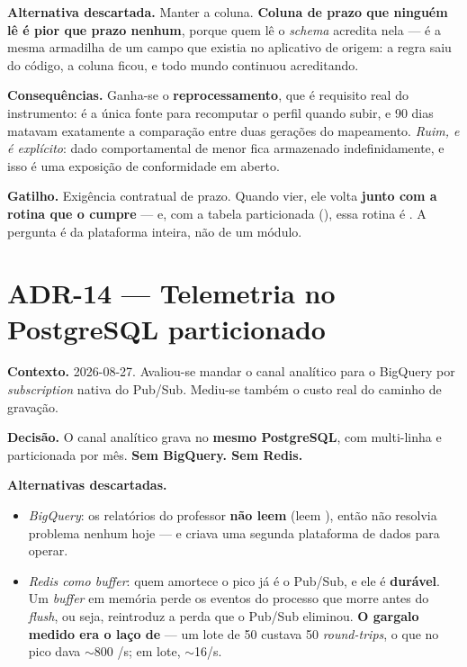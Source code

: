 \textbf{Alternativa descartada.} Manter a coluna. \textbf{Coluna de prazo que
ninguém lê é pior que prazo nenhum}, porque quem lê o \emph{schema} acredita nela
--- é a mesma armadilha de um campo  que existia no
aplicativo de origem: a regra saiu do código, a coluna ficou, e todo mundo
continuou acreditando.

\textbf{Consequências.} Ganha-se o \textbf{reprocessamento}, que é requisito real
do instrumento:  é a única fonte para recomputar o perfil quando
 subir, e 90 dias matavam exatamente a comparação entre
duas gerações do mapeamento. \emph{Ruim, e é explícito}: dado comportamental de
menor fica armazenado indefinidamente, e isso é uma exposição de conformidade em
aberto.

\textbf{Gatilho.} Exigência contratual de prazo. Quando vier, ele volta
\textbf{junto com a rotina que o cumpre} --- e, com a tabela particionada
(), essa rotina é . A pergunta é da
plataforma inteira, não de um módulo.

\section{ADR-14 --- Telemetria no PostgreSQL particionado}

\textbf{Contexto.} 2026-08-27. Avaliou-se mandar o canal analítico para o BigQuery
por \emph{subscription} nativa do Pub/Sub. Mediu-se também o custo real do
caminho de gravação.

\textbf{Decisão.} O canal analítico grava no \textbf{mesmo PostgreSQL}, com
 multi-linha e  particionada por mês.
\textbf{Sem BigQuery. Sem Redis.}

\textbf{Alternativas descartadas.}
\begin{itemize}
  \item \emph{BigQuery}: os relatórios do professor \textbf{não leem}
     (leem ), então não resolvia
    problema nenhum hoje --- e criava uma segunda plataforma de dados para
    operar.
  \item \emph{Redis como \emph{buffer}}: quem amortece o pico já é o Pub/Sub, e
    ele é \textbf{durável}. Um \emph{buffer} em memória perde os eventos do
    processo que morre antes do \emph{flush}, ou seja, reintroduz a perda que o
    Pub/Sub eliminou. \textbf{O gargalo medido era o laço de } --- um
    lote de 50 custava 50 \emph{round-trips}, o que no pico dava
    $\sim$800 /s; em lote, $\sim$16/s.
\end{itemize}

